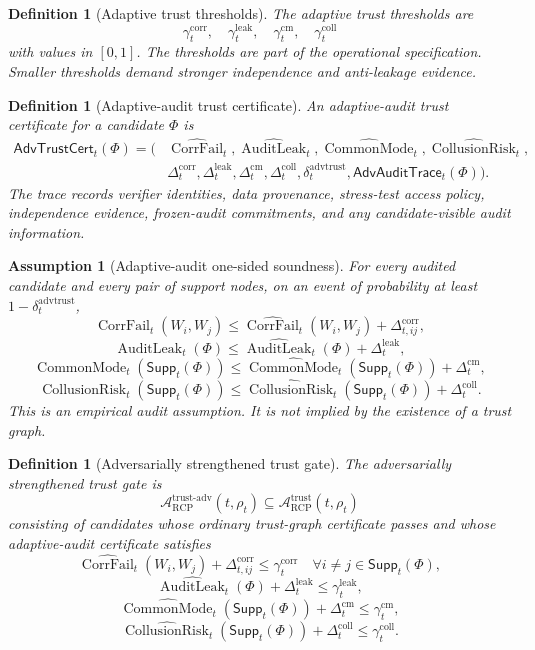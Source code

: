 \documentclass[11pt]{article}
\newtheorem{definition}[theorem]{Definition}
\newtheorem{assumption}[theorem]{Assumption}
\newcommand{\Acal}{\mathcal{A}}
\newcommand{\1}{\mathbf{1}}
\newcommand{\RCP}{\mathrm{RCP}}
\providecommand{\CorrFail}{\operatorname{CorrFail}}
\providecommand{\AuditLeak}{\operatorname{AuditLeak}}
\providecommand{\CommonMode}{\operatorname{CommonMode}}
\providecommand{\CollusionRisk}{\operatorname{CollusionRisk}}
\begin{document}
\begin{definition}[Adaptive trust thresholds]
\label{def:adaptive_trust_thresholds_batch10}
The adaptive trust thresholds are
\[
\gamma_t^{\mathrm{corr}},\quad
\gamma_t^{\mathrm{leak}},\quad
\gamma_t^{\mathrm{cm}},\quad
\gamma_t^{\mathrm{coll}}
\]
with values in \([0,1]\).  The thresholds are part of the operational specification.  Smaller thresholds demand stronger independence and anti-leakage evidence.
\end{definition}

\begin{definition}[Adaptive-audit trust certificate]
\label{def:adaptive_audit_trust_certificate_batch10}
An adaptive-audit trust certificate for a candidate \(\Phi\) is
\[
\begin{aligned}
\mathsf{AdvTrustCert}_t(\Phi)=(&\widehat{\CorrFail}_t,\widehat{\AuditLeak}_t,
\widehat{\CommonMode}_t,\widehat{\CollusionRisk}_t,\\
&\Delta_t^{\mathrm{corr}},\Delta_t^{\mathrm{leak}},\Delta_t^{\mathrm{cm}},\Delta_t^{\mathrm{coll}},
\delta_t^{\mathrm{advtrust}},\mathsf{AdvAuditTrace}_t(\Phi)).
\end{aligned}
\]
The trace records verifier identities, data provenance, stress-test access policy, independence evidence, frozen-audit commitments, and any candidate-visible audit information.
\end{definition}

\begin{assumption}[Adaptive-audit one-sided soundness]
\label{ass:adaptive_audit_one_sided_soundness_batch10}
For every audited candidate and every pair of support nodes, on an event of probability at least \(1-\delta_t^{\mathrm{advtrust}}\),
\[
\CorrFail_t(W_i,W_j)
\le
\widehat{\CorrFail}_t(W_i,W_j)+\Delta_{t,ij}^{\mathrm{corr}},
\]
\[
\AuditLeak_t(\Phi)
\le
\widehat{\AuditLeak}_t(\Phi)+\Delta_t^{\mathrm{leak}},
\]
\[
\CommonMode_t(\mathsf{Supp}_t(\Phi))
\le
\widehat{\CommonMode}_t(\mathsf{Supp}_t(\Phi))+\Delta_t^{\mathrm{cm}},
\]
\[
\CollusionRisk_t(\mathsf{Supp}_t(\Phi))
\le
\widehat{\CollusionRisk}_t(\mathsf{Supp}_t(\Phi))+\Delta_t^{\mathrm{coll}}.
\]
This is an empirical audit assumption.  It is not implied by the existence of a trust graph.
\end{assumption}

\begin{definition}[Adversarially strengthened trust gate]
\label{def:adversarially_strengthened_trust_gate_batch10}
The adversarially strengthened trust gate is
\[
\Acal_{\RCP}^{\mathrm{trust\mbox{-}adv}}(t,\rho_t)
\subseteq
\Acal_{\RCP}^{\mathrm{trust}}(t,\rho_t)
\]
consisting of candidates whose ordinary trust-graph certificate passes and whose adaptive-audit certificate satisfies
\[
\widehat{\CorrFail}_t(W_i,W_j)+\Delta_{t,ij}^{\mathrm{corr}}
\le
\gamma_t^{\mathrm{corr}}
\quad\forall i\ne j\in\mathsf{Supp}_t(\Phi),
\]
\[
\widehat{\AuditLeak}_t(\Phi)+\Delta_t^{\mathrm{leak}}
\le
\gamma_t^{\mathrm{leak}},
\]
\[
\widehat{\CommonMode}_t(\mathsf{Supp}_t(\Phi))+\Delta_t^{\mathrm{cm}}
\le
\gamma_t^{\mathrm{cm}},
\]
\[
\widehat{\CollusionRisk}_t(\mathsf{Supp}_t(\Phi))+\Delta_t^{\mathrm{coll}}
\le
\gamma_t^{\mathrm{coll}}.
\]
\end{definition}
\end{document}

